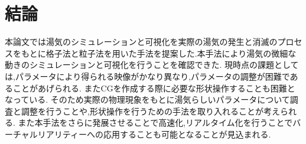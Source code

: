\chapter{結論}

本論文では湯気のシミュレーションと可視化を実際の湯気の発生と消滅のプロセスをもとに格子法と粒子法を用いた手法を提案した.本手法により湯気の微細な動きのシミュレーションと可視化を行うことを確認できた.
現時点の課題としては,パラメータにより得られる映像がかなり異なり,パラメータの調整が困難であることがあげられる.
またCGを作成する際に必要な形状操作することも困難となっている.
そのため実際の物理現象をもとに湯気らしいパラメータについて調査と調整を行うことや,形状操作を行うための手法を取り入れることが考えられる.
また本手法をさらに発展させることで高速化,リアルタイム化を行うことでバーチャルリアリティーへの応用することも可能となることが見込まれる.

